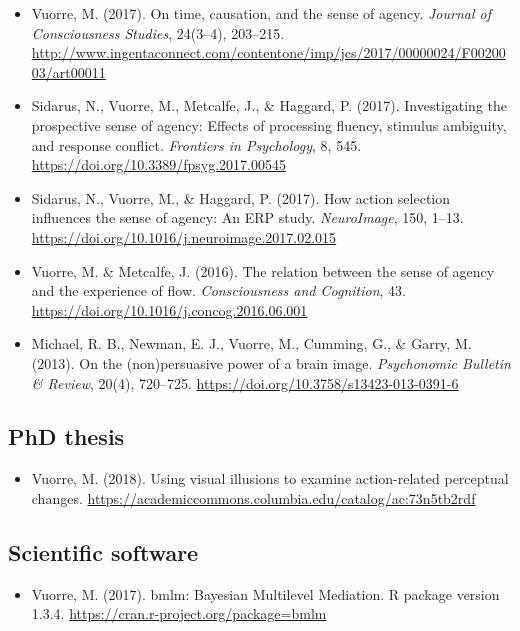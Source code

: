 \documentclass[12pt, a4paper]{article}
\newcommand{\years}[1]{\marginnote{\scriptsize #1}}
\begin{document}
\begin{itemize}
\item Vuorre, M. (2017). On time, causation, and the sense of agency. \emph{Journal of Consciousness Studies}, 24(3–4), 203–215. \url{http://www.ingentaconnect.com/contentone/imp/jcs/2017/00000024/F0020003/art00011}
\item Sidarus, N., Vuorre, M., Metcalfe, J., \& Haggard, P. (2017). Investigating the prospective sense of agency: Effects of processing fluency, stimulus ambiguity, and response conflict. \emph{Frontiers in Psychology}, 8, 545. \url{https://doi.org/10.3389/fpsyg.2017.00545}
\item Sidarus, N., Vuorre, M., \& Haggard, P. (2017). How action selection influences the sense of agency: An ERP study. \emph{NeuroImage}, 150, 1–13. \url{https://doi.org/10.1016/j.neuroimage.2017.02.015}
\item \years{2016} Vuorre, M. \& Metcalfe, J. (2016). The relation between the sense of agency and the experience of flow. \emph{Consciousness and Cognition}, 43. \url{https://doi.org/10.1016/j.concog.2016.06.001}
\item \years{2013} Michael, R. B., Newman, E. J., Vuorre, M., Cumming, G., \& Garry, M. (2013). On the (non)persuasive power of a brain image. \emph{Psychonomic Bulletin \& Review}, 20(4), 720–725. \url{https://doi.org/10.3758/s13423-013-0391-6}
\end{itemize}

\subsection*{PhD thesis}
\begin{itemize}
\item \years{2018} Vuorre, M. (2018). Using visual illusions to examine action-related perceptual changes. \url{https://academiccommons.columbia.edu/catalog/ac:73n5tb2rdf}
\end{itemize}

\subsection*{Scientific software}
\begin{itemize}
\item \years{2017} Vuorre, M. (2017). bmlm: Bayesian Multilevel Mediation. R package version 1.3.4. \url{https://cran.r-project.org/package=bmlm}
\end{itemize}
\end{document}
